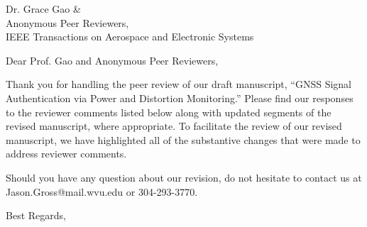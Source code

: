 \documentclass[12pt]{letter}
\begin{document}
\begin{letter}
{
    Dr. Grace Gao \& \\ Anonymous Peer Reviewers,\\
    IEEE Transactions on Aerospace and Electronic Systems\\
    
}

\opening{Dear Prof. Gao and Anonymous Peer Reviewers,}

Thank you for handling the peer review of our draft manuscript, ``GNSS Signal
Authentication via Power and Distortion Monitoring.'' Please find our responses
to the reviewer comments listed below along with updated segments of the
revised manuscript, where appropriate.  To facilitate the review of our revised
manuscript, we have highlighted all of the substantive changes that were made
to address reviewer comments.

Should you have any question about our revision, do not hesitate to contact us
at Jason.Gross@mail.wvu.edu or 304-293-3770.

\closing{Best Regards,}

\end{letter}
\end{document}
